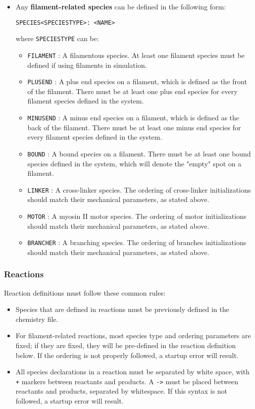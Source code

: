 \documentclass[11pt, oneside]{article}   	%
\begin{document}
\begin{itemize}
\item
Any \textbf{filament-related species} can be defined in the following form:\newline\newline\centerline{\texttt{SPECIES<SPECIESTYPE>: <NAME>}}\newline\newline where \texttt{SPECIESTYPE} can be:
\begin{itemize}
\item \texttt{FILAMENT} : A filamentous species. At least one filament species must be defined if using filaments in simulation.
\item \texttt{PLUSEND} : A plus end species on a filament, which is defined as the front of the filament. There must be at least one plus end species for every filament species defined in the system.
\item \texttt{MINUSEND} : A minus end species on a filament, which is defined as the back of the filament. There must be at least one minus end species for every filament species defined in the system.
\item \texttt{BOUND} : A bound species on a filament. There must be at least one bound species defined in the system, which will denote the "empty" spot on a filament.
\item \texttt{LINKER} : A cross-linker species. The ordering of cross-linker initializations should match their mechanical parameters, as stated above.
\item \texttt{MOTOR} : A myosin II motor species. The ordering of motor initializations should match their mechanical parameters, as stated above.
\item \texttt{BRANCHER} : A branching species. The ordering of branches initializations should match their mechanical parameters, as stated above.
\end{itemize}
\end{itemize}

\subsubsection{Reactions}

Reaction definitions must follow these common rules:
\begin{itemize}
\item Species that are defined in reactions must be previously defined in the chemistry file. 
\item For filament-related reactions, most species type and ordering parameters are fixed; if they are fixed, they will be pre-defined in the reaction definition below. If the ordering is not properly followed, a startup error will result. 
\item All species declarations in a reaction must be separated by white space, with \texttt{+} markers between reactants and products. A \texttt{->} must be placed between reactants and products, separated by whitespace. If this syntax is not followed, a startup error will result.
\end{itemize}
\end{document}
